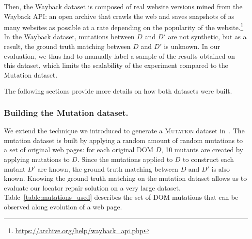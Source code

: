 Then, the {\sc Wayback} dataset is composed of real website versions mined from the Wayback API: an open archive that crawls the web and saves snapshots of as many websites as possible at a rate depending on the popularity of the website.\footnote{\url{https://archive.org/help/wayback_api.php}}
In the {\sc Wayback} dataset, mutations between $D$ and $D'$ are not synthetic, but as a result, the ground truth matching between $D$ and $D'$ is unknown.
In our evaluation, we thus had to manually label a sample of the results obtained on this dataset, which limits the scalability of the experiment compared to the {\sc Mutation} dataset. 

The following sections provide more details on how both datasets were built.

\subsubsection{Building the {\sc Mutation} dataset.}\label{mutationDataset}
We extend the technique we introduced to generate a \textsc{Mutation} dataset in~\cite{brisset2020sftm}.
The mutation dataset is built by applying a random amount of random mutations to a set of original web pages: for each original DOM $D$, 10 mutants are created by applying mutations to $D$.
Since the mutations applied to $D$ to construct each mutant $D'$ are known, the ground truth matching between $D$ and $D'$ is also known.
Knowing the ground truth matching on the mutation dataset allows us to evaluate our locator repair solution on a very large dataset. 
% 
Table~\ref{table:mutations_used} describes the set of DOM mutations that can be observed along evolution of a web page.

\begin{table}
    \caption{Mutations applied in the \textsc{Mutation} dataset~\cite{brisset2020sftm}.}
    \label{table:mutations_used}
    \centering
\end{table}

